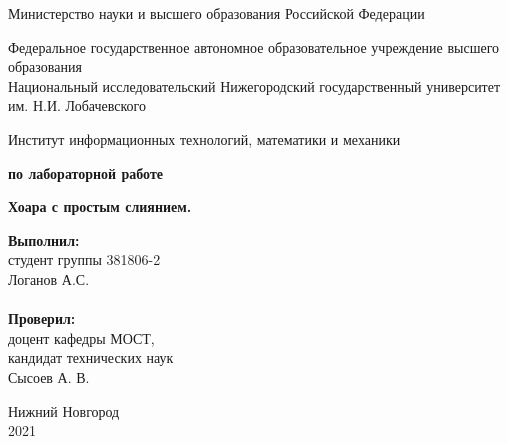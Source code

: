 \documentclass{report}
\begin{document}
\begin{titlepage}

\begin{center}
Министерство науки и высшего образования Российской Федерации
\end{center}

\begin{center}
Федеральное государственное автономное образовательное учреждение высшего образования \\
Национальный исследовательский Нижегородский государственный университет им. Н.И. Лобачевского
\end{center}

\begin{center}
Институт информационных технологий, математики и механики
\end{center}

\vspace{4em}

\begin{center}
\textbf{ по лабораторной работе} \\
\end{center}
\begin{center}
\textbf{ Хоара с простым слиянием.} \\
\end{center}

\vspace{4em}

\newbox{\lbox}
\newlength{\maxl}
\setlength{\maxl}{\wd\lbox}
\hfill\parbox{7cm}{
\hspace*{5cm}\hspace*{-5cm}\textbf{Выполнил:} \\ студент группы 381806-2 \\ Логанов А.С.\\
\\
\hspace*{5cm}\hspace*{-5cm}\textbf{Проверил:}\\ доцент кафедры МОСТ, \\ кандидат технических наук \\ Сысоев А. В.
}

\vspace{\fill}

\begin{center} Нижний Новгород \\ 2021 \end{center}

\end{titlepage}
\end{document}
